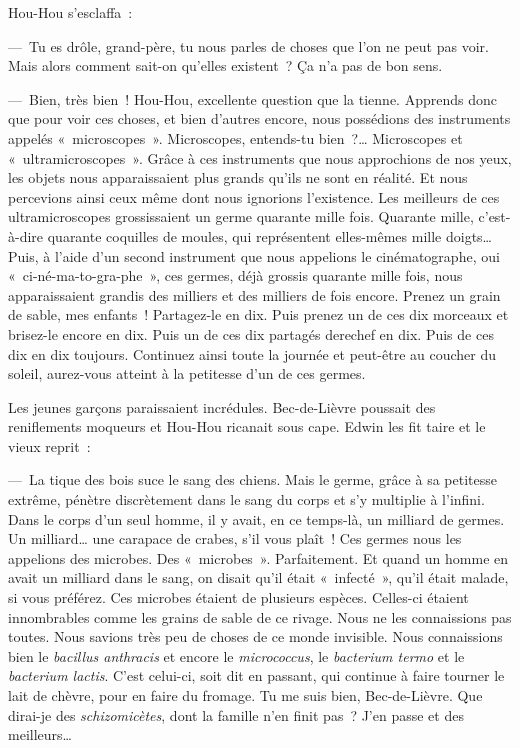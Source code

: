 \documentclass[french,twoside]{book} %
\begin{document}
Hou-Hou s’esclaffa :\par
— Tu es drôle, grand-père, tu nous parles de choses que l’on ne peut pas voir. Mais alors comment sait-on qu’elles existent ? Ça n’a pas de bon sens.\par
— Bien, très bien ! Hou-Hou, excellente question que la tienne. Apprends donc que pour voir ces choses, et bien d’autres encore, nous possédions des instruments appelés « microscopes ». Microscopes, entends-tu bien ?… Microscopes et « ultramicroscopes ». Grâce à ces instruments que nous approchions de nos yeux, les objets nous apparaissaient plus grands qu’ils ne sont en réalité. Et nous percevions ainsi ceux même dont nous ignorions l’existence. Les meilleurs de ces ultramicroscopes grossissaient un germe quarante mille fois. Quarante mille, c’est-à-dire quarante coquilles de moules, qui représentent elles-mêmes mille doigts… Puis, à l’aide d’un second instrument que nous appelions le cinématographe, oui « ci-né-ma-to-gra-phe », ces germes, déjà grossis quarante mille fois, nous apparaissaient grandis des milliers et des milliers de fois encore. Prenez un grain de sable, mes enfants ! Partagez-le en dix. Puis prenez un de ces dix morceaux et brisez-le encore en dix. Puis un de ces dix partagés derechef en dix. Puis de ces dix en dix toujours. Continuez ainsi toute la journée et peut-être au coucher du soleil, aurez-vous atteint à la petitesse d’un de ces germes.\par
Les jeunes garçons paraissaient incrédules. Bec-de-Lièvre poussait des reniflements moqueurs et Hou-Hou ricanait sous cape. Edwin les fit taire et le vieux reprit :\par
— La tique des bois suce le sang des chiens. Mais le germe, grâce à sa petitesse extrême, pénètre discrètement dans le sang du corps et s’y multiplie à l’infini. Dans le corps d’un seul homme, il y avait, en ce temps-là, un milliard de germes. Un milliard… une carapace de crabes, s’il vous plaît ! Ces germes nous les appelions des microbes. Des « microbes ». Parfaitement. Et quand un homme en avait un milliard dans le sang, on disait qu’il était « infecté », qu’il était malade, si vous préférez. Ces microbes étaient de plusieurs espèces. Celles-ci étaient innombrables comme les grains de sable de ce rivage. Nous ne les connaissions pas toutes. Nous savions très peu de choses de ce monde invisible. Nous connaissions bien le \emph{bacillus anthracis} et encore le \emph{micrococcus}, le \emph{bacterium termo} et le \emph{bacterium lactis}. C’est celui-ci, soit dit en passant, qui continue à faire tourner le lait de chèvre, pour en faire du fromage. Tu me suis bien, Bec-de-Lièvre. Que dirai-je des \emph{schizomicètes}, dont la famille n’en finit pas ? J’en passe et des meilleurs…\par
\end{document}
